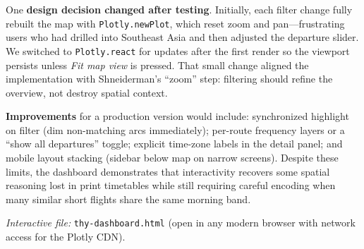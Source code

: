 \documentclass[11pt]{article}
\begin{document}
One \textbf{design decision changed after testing}. Initially, each filter change fully rebuilt the map with \texttt{Plotly.newPlot}, which reset zoom and pan---frustrating users who had drilled into Southeast Asia and then adjusted the departure slider. We switched to \texttt{Plotly.react} for updates after the first render so the viewport persists unless \emph{Fit map view} is pressed. That small change aligned the implementation with Shneiderman's ``zoom'' step: filtering should refine the overview, not destroy spatial context.

\textbf{Improvements} for a production version would include: synchronized highlight on filter (dim non-matching arcs immediately); per-route frequency layers or a ``show all departures'' toggle; explicit time-zone labels in the detail panel; and mobile layout stacking (sidebar below map on narrow screens). Despite these limits, the dashboard demonstrates that interactivity recovers some spatial reasoning lost in print timetables while still requiring careful encoding when many similar short flights share the same morning band.

\noindent\textit{Interactive file:} \texttt{thy-dashboard.html} (open in any modern browser with network access for the Plotly CDN).
\end{document}
